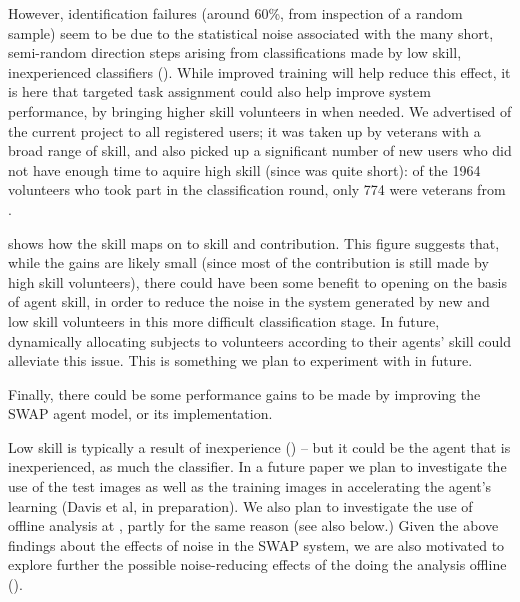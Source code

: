\documentclass[useAMS,usenatbib,a4paper]{mn2e}
\begin{document}
However, identification failures (around 60\%, from inspection of a random sample)
seem to be due to the statistical noise associated with
the many short, semi-random direction steps arising from classifications made by
low skill, inexperienced
classifiers ().
While improved training will help reduce this effect, it is here
that targeted task assignment could also help improve system performance, by
bringing higher skill volunteers in when needed. We
advertised \StageTwo of the current project to all registered users; it was
taken up by \StageOne veterans with a broad range of skill, and also picked up a
significant number of new users who did not have enough time to aquire high
skill (since \StageTwo was quite short): of the 1964 volunteers who took part in
the \StageTwo classification round, only 774 were veterans from \StageOne.

 shows how the \StageOne
skill maps on to \StageTwo skill and contribution. This figure suggests
that, while the gains are likely small (since  most of the contribution
is still made by high skill volunteers),  there could have been some
benefit to opening \StageTwo on the basis of \StageOne agent skill, in
order to reduce the noise in the system generated by new and low skill
volunteers in this more difficult classification stage.  In future,
dynamically allocating subjects to volunteers according to their agents'
skill could alleviate this issue. This is something we plan to
experiment with in future.

Finally, there could be some performance gains to be made by improving the SWAP
agent model, or its implementation.

Low skill is typically a result  of inexperience () --
but it could be the agent  that is inexperienced, as much  the classifier.  In a
future paper we plan to investigate the use of the test images as well as the
training images in accelerating the agent's learning (Davis et al, in
preparation). We also plan to investigate the use of offline analysis at
\StageOne, partly for the same reason (see also 
below.) Given the above findings  about the effects of noise in the SWAP system,
we are also motivated to explore further the possible noise-reducing effects of
the doing the analysis offline ().
\end{document}
